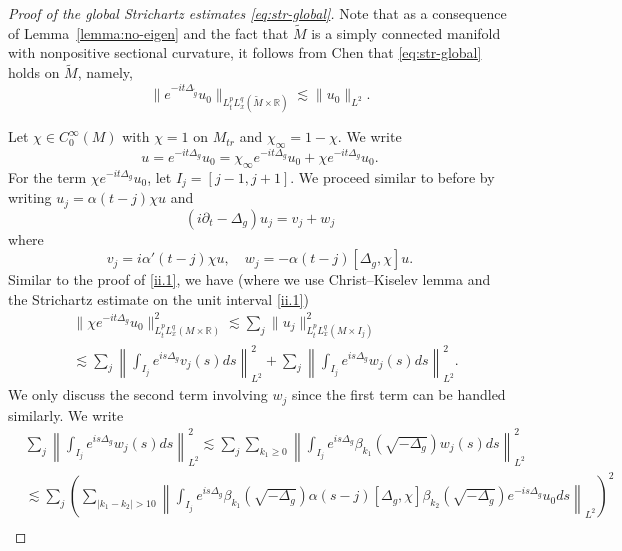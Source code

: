 \documentclass[10pt]{amsart}
\newcommand{\1}{{\bf 1}}
\newcommand{\R}{{\mathbb R}}
\begin{document}
\begin{proof}[Proof of the global Strichartz estimates \eqref{eq:str-global}]
Note that as a consequence of Lemma~\ref{lemma:no-eigen} and the fact that $\tilde M$ is a simply connected manifold with nonpositive sectional curvature, it follows from Chen \cite[Theorem 1]{ChenSt} that \eqref{eq:str-global} holds on $\tilde M$, namely,
\begin{equation}\label{tildems}
    \|e^{-it\Delta_{\tilde{g}}} u_0\|_{L_t^pL^q_x(\tilde{M}\times\R)}\lesssim \|u_0\|_{L^2}.
\end{equation}


Let $\chi\in C_0^\infty(M)$ with $\chi= 1$ on $M_{tr}$ and $\chi_\infty=1-\chi$. We write
\begin{equation*}
    u=e^{-it\Delta_g} u_0 =\chi_{\infty}e^{-it\Delta_g} u_0 +\chi e^{-it\Delta_g} u_0.
\end{equation*}
For the term $\chi e^{-it\Delta_g} u_0$, let $I_j=[j-1, j+1]$. 
We proceed similar to before by writing $u_j=\alpha(t-j) \chi u$ and 
\begin{equation*}
    (i\partial_t-\Delta_g) u_j = v_j+w_j
\end{equation*}
where
\begin{equation*}
    v_j=i\alpha'(t -j)\chi u,\quad w_j = -\alpha(t  -j) [\Delta_g,\chi] u .
\end{equation*}
Similar to the proof of \eqref{ii.1}, we have (where we use Christ--Kiselev lemma and the Strichartz estimate on the unit interval \eqref{ii.1})
\begin{equation}\label{eq:global-stri-add}
\begin{split}
    &\|\chi e^{-it\Delta_g} u_0\|_{L_t^pL_x^q(M\times \mathbb{R})}^2 \lesssim \sum_{j}\|u_j\|_{L_t^pL_x^q(M\times I_j)}^2\\
    &\lesssim \sum_j \left\|\int_{I_j} e^{is\Delta_g} v_j(s) ds\right\|_{L^2}^2+ \sum_j\left\|\int_{I_j} e^{is\Delta_g} w_j(s) ds\right\|_{L^2}^2.
\end{split}
\end{equation}
We only discuss the second term involving $w_j$ since the first term can be handled similarly. 
We write
\begin{equation}\label{eq:global-stri-diag}
\begin{split}
    &\sum_j\left\|\int_{I_j} e^{is\Delta_g} w_j(s) ds\right\|_{L^2}^2 \lesssim \sum_{j}\sum_{k_1\ge 0}\left\|\int_{I_j} e^{is\Delta_g} \beta_{k_1}(\sqrt{-\Delta_g}) w_j(s) ds\right\|_{L^2}^2\\
    &\lesssim \sum_{j}\left(\sum_{|k_1-k_2|>10}\left\|\int_{I_j} e^{is\Delta_g} \beta_{k_1}(\sqrt{-\Delta_g})\alpha(s-j) [\Delta_g,\chi]\beta_{k_2}(\sqrt{-\Delta_g})e^{-is\Delta_g}u_0 ds\right\|_{L^2}\right)^2\\

\end{split}
\end{equation}
\end{proof}
\end{document}
